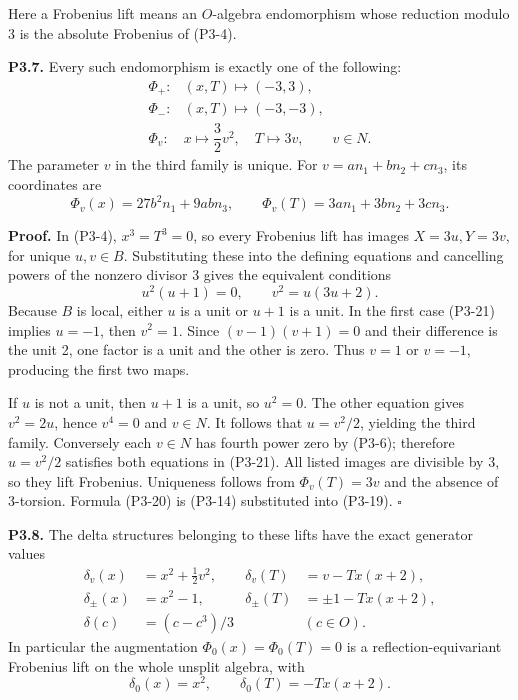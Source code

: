 \documentclass[
  10pt,
]{article}
\begin{document}
Here a Frobenius lift means an \(O\)-algebra endomorphism whose
reduction modulo 3 is the absolute Frobenius of (P3-4).

\textbf{P3.7.} Every such endomorphism is exactly one of the following:
\[
\begin{array}{ll}
\Phi_+:&(x,T)\longmapsto(-3,3),\\
\Phi_-:&(x,T)\longmapsto(-3,-3),\\
\Phi_v:&x\longmapsto\dfrac32v^2,\quad T\longmapsto3v,
\qquad v\in N.
\end{array}
\tag{P3-19}
\] The parameter \(v\) in the third family is unique. For
\(v=an_1+bn_2+cn_3\), its coordinates are \[
\Phi_v(x)=27b^2n_1+9abn_3,\qquad
\Phi_v(T)=3an_1+3bn_2+3cn_3.
\tag{P3-20}
\]

\textbf{Proof.} In (P3-4), \(x^3=T^3=0\), so every Frobenius lift has
images \(X=3u,Y=3v\), for unique \(u,v\in B\). Substituting these into
the defining equations and cancelling powers of the nonzero divisor 3
gives the equivalent conditions \[
u^2(u+1)=0,\qquad v^2=u(3u+2).
\tag{P3-21}
\] Because \(B\) is local, either \(u\) is a unit or \(u+1\) is a unit.
In the first case (P3-21) implies \(u=-1\), then \(v^2=1\). Since
\((v-1)(v+1)=0\) and their difference is the unit 2, one factor is a
unit and the other is zero. Thus \(v=1\) or \(v=-1\), producing the
first two maps.

If \(u\) is not a unit, then \(u+1\) is a unit, so \(u^2=0\). The other
equation gives \(v^2=2u\), hence \(v^4=0\) and \(v\in N\). It follows
that \(u=v^2/2\), yielding the third family. Conversely each \(v\in N\)
has fourth power zero by (P3-6); therefore \(u=v^2/2\) satisfies both
equations in (P3-21). All listed images are divisible by 3, so they lift
Frobenius. Uniqueness follows from \(\Phi_v(T)=3v\) and the absence of
3-torsion. Formula (P3-20) is (P3-14) substituted into (P3-19).
\(\square\)

\textbf{P3.8.} The delta structures belonging to these lifts have the
exact generator values \[
\begin{aligned}
\delta_v(x)&=x^2+\frac12v^2,&
\delta_v(T)&=v-Tx(x+2),\\
\delta_\pm(x)&=x^2-1,&
\delta_\pm(T)&=\pm1-Tx(x+2),\\
\delta(c)&=(c-c^3)/3&& (c\in O).
\end{aligned}
\tag{P3-22}
\] In particular the augmentation \(\Phi_0(x)=\Phi_0(T)=0\) is a
reflection-equivariant Frobenius lift on the whole unsplit algebra, with
\[
\delta_0(x)=x^2,\qquad \delta_0(T)=-Tx(x+2).
\tag{P3-23}
\]
\end{document}
